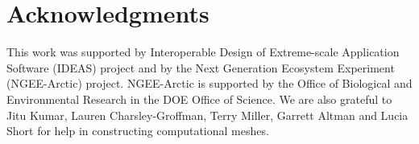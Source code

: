 \documentclass[review,11pt]{elsarticle}
\begin{document}
\section*{Acknowledgments} 

This work was supported by Interoperable Design of Extreme-scale Application Software (IDEAS) project and by the Next Generation Ecosystem Experiment
(NGEE-Arctic) project. NGEE-Arctic is supported by the Office of Biological and Environmental Research in the DOE Office of Science. We are also
grateful to Jitu Kumar, Lauren Charsley-Groffman, Terry Miller, Garrett Altman and Lucia Short  for help in constructing computational meshes. 


\appendix
\end{document}
